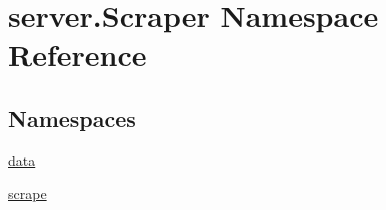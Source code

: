 \hypertarget{namespaceserver_1_1_scraper}{}\section{server.\+Scraper Namespace Reference}
\label{namespaceserver_1_1_scraper}
\subsection*{Namespaces}
\begin{DoxyCompactItemize}
\item 
 \mbox{\hyperlink{namespaceserver_1_1_scraper_1_1data}{data}}
\item 
 \mbox{\hyperlink{namespaceserver_1_1_scraper_1_1scrape}{scrape}}
\end{DoxyCompactItemize}
